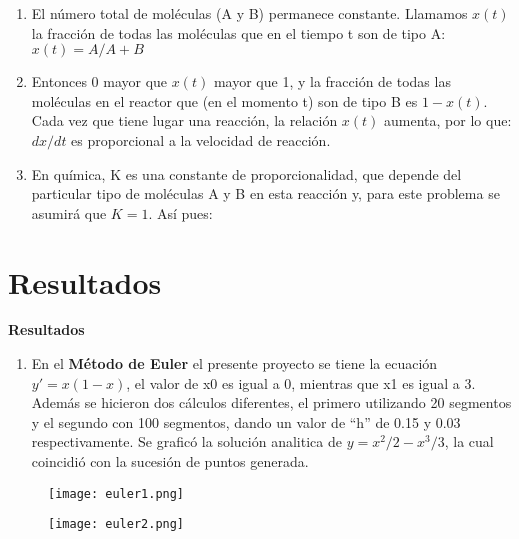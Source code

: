 \documentclass{beamer}
\begin{document}
\begin{frame}
	\begin{enumerate}
		\item
			El número total de moléculas (A y B) permanece constante. Llamamos $x(t)$ la fracción de todas las moléculas que en el tiempo t son de tipo A: $x(t)=A/A+B$
				
		\item
			Entonces 0 mayor que $x(t)$ mayor que 1, y la fracción de todas las moléculas en el reactor que (en el momento t) son de tipo B es $1-x(t)$. Cada vez que tiene lugar una reacción, la relación $x(t)$ aumenta, por lo que: $dx/dt$ es proporcional a la velocidad de reacción.
				
		\item
			En química, K es una constante de proporcionalidad, que depende del particular tipo de moléculas A y B en esta reacción y, para este problema se asumirá que $K=1$. Así pues:

	\end{enumerate} 
\end{frame}

\section{Resultados }

\begin{frame}
	\textbf{Resultados}
	\begin{enumerate}
		\item
			En el \textbf{Método de Euler} el presente proyecto se tiene la ecuación $y'=x(1-x)$, el valor de x0 es igual a 0, mientras que x1 es igual a 3. Además se hicieron dos cálculos diferentes, el primero utilizando 20 segmentos y el segundo con 100 segmentos, dando un valor de “h” de 0.15 y 0.03 respectivamente. Se graficó la solución analitica de $y=x^2/2 - x^3/3$, la cual coincidió con la sucesión de puntos generada.		
	\end{enumerate} 
	\begin{figure}[H]
		\centering
		\texttt{[image: euler1.png]}
		\label{fig: Figura4}
	\end{figure}
	\begin{figure}[H]
		\centering
		\texttt{[image: euler2.png]}
		\label{fig: Figura5}
	\end{figure}
\end{frame}
\end{document}
